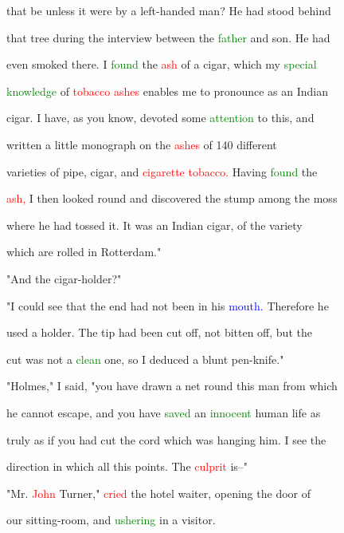  that be unless it were by a left-handed man? He had stood behind

 that \textcolor{BurntOrange}{tree} during the interview between the \textcolor{green}{father} and son. He had

 even smoked there. I \textcolor{green}{found} the \textcolor{red}{ash} of a cigar, which my \textcolor{green}{special}

 \textcolor{green}{knowledge} of \textcolor{red}{tobacco} \textcolor{red}{ashes} enables me to pronounce as an Indian

 cigar. I have, as you know, devoted some \textcolor{green}{attention} to this, and

 written a little monograph on the \textcolor{red}{ashes} of 140 different

 varieties of pipe, cigar, and \textcolor{red}{cigarette} \textcolor{red}{tobacco.} Having \textcolor{green}{found} the

 \textcolor{red}{ash,} I then looked round and discovered the stump among the moss

 where he had tossed it. It was an Indian cigar, of the variety

 which are rolled in Rotterdam."



 "And the cigar-holder?"



 "I could see that the end had not been in his \textcolor{blue}{mouth.} Therefore he

 used a holder. The tip had been cut off, not bitten off, but the

 cut was not a \textcolor{green}{clean} one, so I deduced a blunt pen-knife."



 "Holmes," I said, "you have drawn a net round this man from which

 he cannot \textcolor{BurntOrange}{escape,} and you have \textcolor{green}{saved} an \textcolor{green}{innocent} human life as

 truly as if you had cut the cord which was hanging him. I see the

 direction in which all this points. The \textcolor{red}{culprit} is--"



 "Mr. \textcolor{red}{John} Turner," \textcolor{red}{cried} the hotel waiter, opening the door of

 our sitting-room, and \textcolor{green}{ushering} in a \textcolor{BurntOrange}{visitor.}



